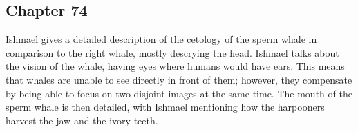 \subsection{Chapter 74}

Ishmael gives a detailed description of the cetology of the sperm whale in
comparison to the right whale, mostly descrying the head. Ishmael talks about
the vision of the whale, having eyes where humans would have ears. This means
that whales are unable to see directly in front of them; however, they
compensate by being able to focus on two disjoint images at the same time. The
mouth of the sperm whale is then detailed, with Ishmael mentioning how the
harpooners harvest the jaw and the ivory teeth.
